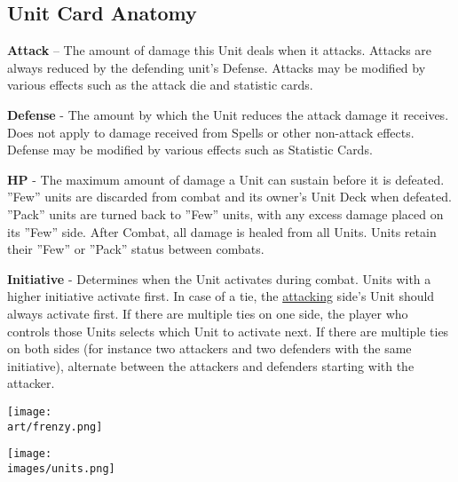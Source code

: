 \begin{multicols}{2}
\subsection*{Unit Card Anatomy}

\vspace{0pt}

\textbf{Attack} – The amount of damage this Unit deals when it attacks.
Attacks are always reduced by the defending unit's Defense.
Attacks may be modified by various effects such as the attack die and statistic cards.\par
\textbf{Defense} - The amount by which the Unit reduces the attack damage it receives.
Does not apply to damage received from Spells or other non-attack effects.
Defense may be modified by various effects such as Statistic Cards.\par
\textbf{\hypertarget{HP}{HP}} - The maximum amount of damage a Unit can sustain before it is defeated.
”Few” units are discarded from combat and its owner's Unit Deck when defeated.
”Pack” units are turned back to ”Few” units, with any excess damage placed on its ”Few” side.
After Combat, all damage is healed from all Units.
Units retain their ”Few” or ”Pack” status between combats.\par
{\hypertarget{Initiative}{\textbf{Initiative}}} - Determines when the Unit activates during combat.
Units with a higher initiative activate first.
In case of a tie, the \hyperlink{Combatterminology}{attacking} side's Unit should always activate first.
If there are multiple ties on one side, the player who controls those Units selects which Unit to activate next.
If there are multiple ties on both sides (for instance two attackers and two defenders with the same initiative), alternate between the attackers and defenders starting with the attacker.\par
\bigskip

\begin{center}
  \texttt{[image: \\art/frenzy.png]}
\end{center}

\begin{center}
  \texttt{[image: \\images/units.png]}
\end{center}
\bigskip

\vspace*{\fill}


\end{multicols}
